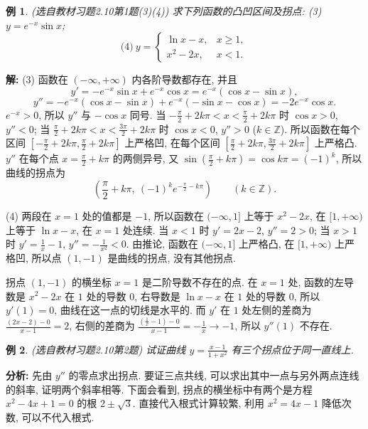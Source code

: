 \documentclass[UTF8,openany]{ctexbook}
\theoremstyle{chinesetextbook}
\newtheorem{example}{例}[section]
\newenvironment{cnsolution}{\par\indent\textbf{解:} \ignorespaces}{\par}
\begin{document}
\begin{example}\label{ex:c2-h10-1}
\textnormal{(选自教材习题2.10第1题(3)(4))} 求下列函数的凸凹区间及拐点: (3) $y=e^{-x}\sin x$;
\[
\text{(4)}\ y=\begin{cases}\ln x-x,&x\ge1,\\x^2-2x,&x<1.\end{cases}
\]
\end{example}
\begin{cnsolution}
(3) 函数在 $(-\infty,+\infty)$ 内各阶导数都存在, 并且
\[
y'=-e^{-x}\sin x+e^{-x}\cos x=e^{-x}(\cos x-\sin x),
\]
\[
y''=-e^{-x}(\cos x-\sin x)+e^{-x}(-\sin x-\cos x)=-2e^{-x}\cos x.
\]
$e^{-x}>0$, 所以 $y''$ 与 $-\cos x$ 同号. 当 $\displaystyle-\frac\pi2+2k\pi<x<\frac\pi2+2k\pi$ 时 $\cos x>0$, $y''<0$; 当 $\displaystyle\frac\pi2+2k\pi<x<\frac{3\pi}2+2k\pi$ 时 $\cos x<0$, $y''>0$ ($k\in\mathbb Z$). 所以函数在每个区间 $\displaystyle\left[-\frac\pi2+2k\pi,\frac\pi2+2k\pi\right]$ 上严格凹, 在每个区间 $\displaystyle\left[\frac\pi2+2k\pi,\frac{3\pi}2+2k\pi\right]$ 上严格凸. $y''$ 在每个点 $\displaystyle x=\frac\pi2+k\pi$ 的两侧异号, 又 $\displaystyle\sin\left(\frac\pi2+k\pi\right)=\cos k\pi=(-1)^k$, 所以曲线的拐点为
\[
\left(\frac\pi2+k\pi,\ (-1)^ke^{-\frac\pi2-k\pi}\right)\qquad(k\in\mathbb Z).
\]

(4) 两段在 $x=1$ 处的值都是 $-1$, 所以函数在 $(-\infty,1]$ 上等于 $x^2-2x$, 在 $[1,+\infty)$ 上等于 $\ln x-x$, 在 $x=1$ 处连续. 当 $x<1$ 时 $y'=2x-2$, $y''=2>0$; 当 $x>1$ 时 $\displaystyle y'=\frac1x-1$, $\displaystyle y''=-\frac1{x^2}<0$. 由推论, 函数在 $(-\infty,1]$ 上严格凸, 在 $[1,+\infty)$ 上严格凹, 所以点 $(1,-1)$ 是曲线的拐点, 没有其他拐点.

拐点 $(1,-1)$ 的横坐标 $x=1$ 是二阶导数不存在的点. 在 $x=1$ 处, 函数的左导数是 $x^2-2x$ 在 $1$ 处的导数 $0$, 右导数是 $\ln x-x$ 在 $1$ 处的导数 $0$, 所以 $y'(1)=0$, 曲线在这一点的切线是水平的. 而 $y'$ 在 $1$ 处左侧的差商为 $\displaystyle\frac{(2x-2)-0}{x-1}=2$, 右侧的差商为 $\displaystyle\frac{\left(\frac1x-1\right)-0}{x-1}=-\frac1x\to-1$, 所以 $y''(1)$ 不存在.
\end{cnsolution}
\begin{example}\label{ex:c2-h10-2}
\textnormal{(选自教材习题2.10第2题)} 试证曲线 $\displaystyle y=\frac{x-1}{1+x^2}$ 有三个拐点位于同一直线上.
\end{example}
\par\indent\textbf{分析:} 先由 $y''$ 的零点求出拐点. 要证三点共线, 可以求出其中一点与另外两点连线的斜率, 证明两个斜率相等. 下面会看到, 拐点的横坐标中有两个是方程 $x^2-4x+1=0$ 的根 $2\pm\sqrt3$. 直接代入根式计算较繁, 利用 $x^2=4x-1$ 降低次数, 可以不代入根式.
\end{document}
